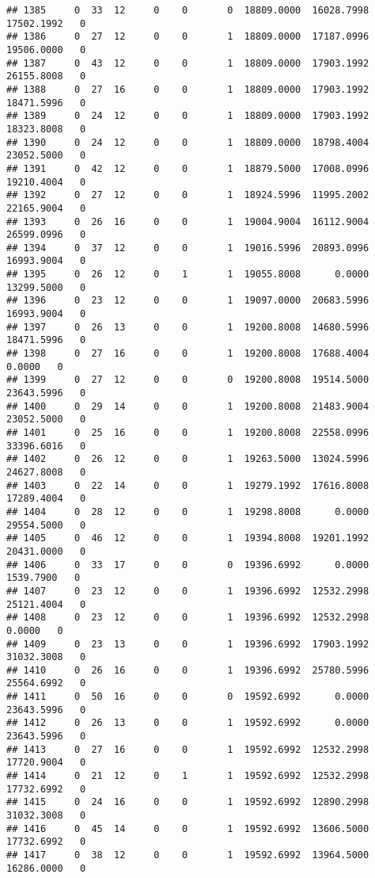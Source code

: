 \documentclass[
]{article}
\begin{document}
\begin{enumerate}
\begin{verbatim}
## 1385     0  33  12     0    0       0  18809.0000  16028.7998  17502.1992   0
## 1386     0  27  12     0    0       1  18809.0000  17187.0996  19506.0000   0
## 1387     0  43  12     0    0       1  18809.0000  17903.1992  26155.8008   0
## 1388     0  27  16     0    0       1  18809.0000  17903.1992  18471.5996   0
## 1389     0  24  12     0    0       1  18809.0000  17903.1992  18323.8008   0
## 1390     0  24  12     0    0       1  18809.0000  18798.4004  23052.5000   0
## 1391     0  42  12     0    0       1  18879.5000  17008.0996  19210.4004   0
## 1392     0  27  12     0    0       1  18924.5996  11995.2002  22165.9004   0
## 1393     0  26  16     0    0       1  19004.9004  16112.9004  26599.0996   0
## 1394     0  37  12     0    0       1  19016.5996  20893.0996  16993.9004   0
## 1395     0  26  12     0    1       1  19055.8008      0.0000  13299.5000   0
## 1396     0  23  12     0    0       1  19097.0000  20683.5996  16993.9004   0
## 1397     0  26  13     0    0       1  19200.8008  14680.5996  18471.5996   0
## 1398     0  27  16     0    0       1  19200.8008  17688.4004      0.0000   0
## 1399     0  27  12     0    0       0  19200.8008  19514.5000  23643.5996   0
## 1400     0  29  14     0    0       1  19200.8008  21483.9004  23052.5000   0
## 1401     0  25  16     0    0       1  19200.8008  22558.0996  33396.6016   0
## 1402     0  26  12     0    0       1  19263.5000  13024.5996  24627.8008   0
## 1403     0  22  14     0    0       1  19279.1992  17616.8008  17289.4004   0
## 1404     0  28  12     0    0       1  19298.8008      0.0000  29554.5000   0
## 1405     0  46  12     0    0       1  19394.8008  19201.1992  20431.0000   0
## 1406     0  33  17     0    0       0  19396.6992      0.0000   1539.7900   0
## 1407     0  23  12     0    0       1  19396.6992  12532.2998  25121.4004   0
## 1408     0  23  12     0    0       1  19396.6992  12532.2998      0.0000   0
## 1409     0  23  13     0    0       1  19396.6992  17903.1992  31032.3008   0
## 1410     0  26  16     0    0       1  19396.6992  25780.5996  25564.6992   0
## 1411     0  50  16     0    0       0  19592.6992      0.0000  23643.5996   0
## 1412     0  26  13     0    0       1  19592.6992      0.0000  23643.5996   0
## 1413     0  27  16     0    0       1  19592.6992  12532.2998  17720.9004   0
## 1414     0  21  12     0    1       1  19592.6992  12532.2998  17732.6992   0
## 1415     0  24  16     0    0       1  19592.6992  12890.2998  31032.3008   0
## 1416     0  45  14     0    0       1  19592.6992  13606.5000  17732.6992   0
## 1417     0  38  12     0    0       1  19592.6992  13964.5000  16286.0000   0

\end{verbatim}
\end{enumerate}
\end{document}
